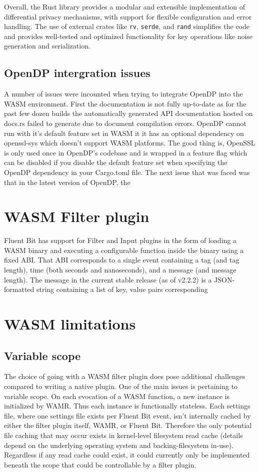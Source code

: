 Overall, the Rust library provides a modular and extensible implementation of differential privacy mechanisms, with support for flexible configuration and error handling. The use of external crates like \texttt{rv}, \texttt{serde}, and \texttt{rand} simplifies the code and provides well-tested and optimized functionality for key operations like noise generation and serialization.

\subsection{OpenDP intergration issues}
A number of issues were incounted when trying to integrate OpenDP into the WASM environment. First the documentation is not fully up-to-date as for the past few dozen builds the automatically generated API documentation hosted on docs.rs failed to generate due to document compilation errors. OpenDP cannot run with it's default feature set in WASM it it has an optional dependency on openssl-sys which doesn't support WASM platforms. The good thing is, OpenSSL is only used once in OpenDP's codebase and is wrapped in a feature flag which can be disabled if you disable the default feature set when specifying the OpenDP dependency in your Cargo.toml file. The next issue that was faced was that in the latest version of OpenDP, the 
\section{WASM Filter plugin}
Fluent Bit has support for Filter and Input plugins in the form of loading a WASM binary and executing a configurable function inside the binary using a fixed ABI. That ABI corresponds to a single event containing a tag (and tag length), time (both seconds and nanoseconds), and a message (and message length). The message in the current stable release (as of v2.2.2) is a JSON-formatted string containing a list of key, value pairs corresponding 

\section{WASM limitations}
\subsection{Variable scope}
The choice of going with a WASM filter plugin does pose additional challenges compared to writing a native plugin. One of the main issues is pertaining to variable scope. On each evocation of a WASM function, a new instance is initialized by WAMR. Thus each instance is functionally stateless. Each settings file, where one settings file exists per Fluent Bit event, isn't internally cached by either the filter plugin itself, WAMR, or Fluent Bit. Therefore the only potential file caching that may occur exists in kernel-level filesystem read cache (details depend on the underlying operating system and backing-filesystem in-use). Regardless if any read cache could exist, it could currently only be implemented beneath the scope that could be controllable by a filter plugin.

